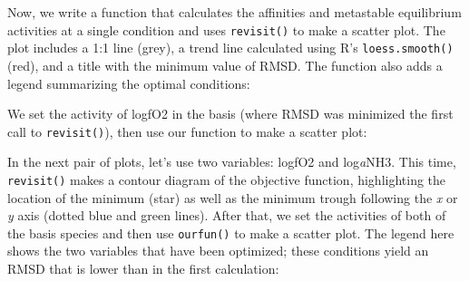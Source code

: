 \documentclass[]{tufte-book}
\newenvironment{Shaded}{}{}
\newcommand{\KeywordTok}[1]{\textcolor[rgb]{0.00,0.44,0.13}{\textbf{#1}}}
\newcommand{\DataTypeTok}[1]{\textcolor[rgb]{0.56,0.13,0.00}{#1}}
\newcommand{\DecValTok}[1]{\textcolor[rgb]{0.25,0.63,0.44}{#1}}
\newcommand{\FloatTok}[1]{\textcolor[rgb]{0.25,0.63,0.44}{#1}}
\newcommand{\StringTok}[1]{\textcolor[rgb]{0.25,0.44,0.63}{#1}}
\newcommand{\ControlFlowTok}[1]{\textcolor[rgb]{0.00,0.44,0.13}{\textbf{#1}}}
\newcommand{\OperatorTok}[1]{\textcolor[rgb]{0.40,0.40,0.40}{#1}}
\newcommand{\NormalTok}[1]{#1}
\begin{document}
Now, we write a function that calculates the affinities and metastable
equilibrium activities at a single condition and uses
{\texttt{revisit()}} to make a scatter plot. The plot includes a 1:1
line (grey), a trend line calculated using R's \texttt{loess.smooth()}
(red), and a title with the minimum value of RMSD. The function also
adds a legend summarizing the optimal conditions:

\begin{Shaded}
\end{Shaded}

We set the activity of logfO2 in the basis (where RMSD was minimized the
first call to {\texttt{revisit()}}), then use our function to make a
scatter plot:

\begin{Shaded}
\end{Shaded}

In the next pair of plots, let's use two variables: logfO2 and
log\emph{a}NH3. This time, {\texttt{revisit()}} makes a contour diagram
of the objective function, highlighting the location of the minimum
(star) as well as the minimum trough following the \emph{x} or \emph{y}
axis (dotted blue and green lines). After that, we set the activities of
both of the basis species and then use \texttt{ourfun()} to make a
scatter plot. The legend here shows the two variables that have been
optimized; these conditions yield an RMSD that is lower than in the
first calculation:
\end{document}
